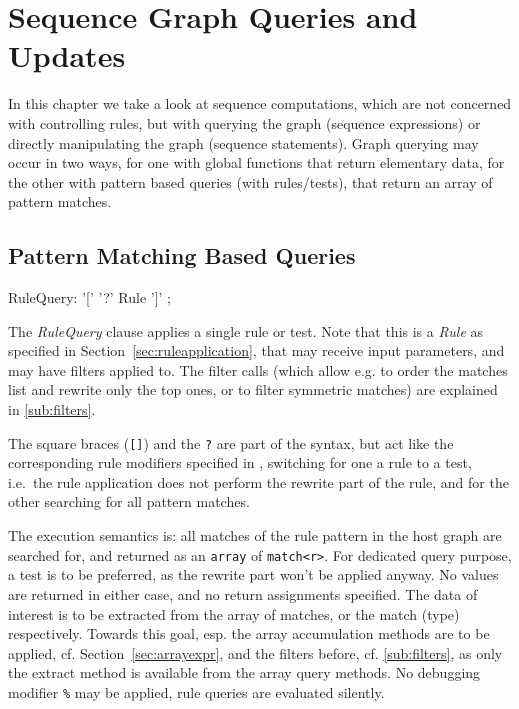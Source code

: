 \chapter{Sequence Graph Queries and Updates}\label{cha:graphquery}%

In this chapter we take a look at sequence computations, which are not concerned with controlling rules, but with querying the graph (sequence expressions) or directly manipulating the graph (sequence statements).
Graph querying may occur in two ways, for one with global functions that return elementary data, for the other with pattern based queries (with rules/tests), that return an array of pattern matches.

\section{Pattern Matching Based Queries}

\begin{rail}
  RuleQuery: '[' '?' Rule ']' ;
\end{rail}

The \emph{RuleQuery} clause applies a single rule or test.
Note that this is a \emph{Rule} as specified in Section~\ref{sec:ruleapplication}, that may receive input parameters, and may have filters applied to.
The filter calls (which allow e.g. to order the matches list and rewrite only the top ones, or to filter symmetric matches) are explained in \ref{sub:filters}.

The square braces (\texttt{[]}) and the \texttt{?} are part of the syntax, but act like the corresponding rule modifiers specified in \label{sec:ruleapplication}, switching for one a rule to a test, i.e.\ the rule application does not perform the rewrite part of the rule, and for the other searching for all pattern matches.

The execution semantics is: all matches of the rule pattern in the host graph are searched for, and returned as an \texttt{array} of \texttt{match<r>}.
For dedicated query purpose, a test is to be preferred, as the rewrite part won't be applied anyway. 
No values are returned in either case, and no return assignments specified.
The data of interest is to be extracted from the array of matches, or the match (type) respectively.
Towards this goal, esp. the array accumulation methods are to be applied, cf. Section~\ref{sec:arrayexpr}, and the filters before, cf. \ref{sub:filters}, as only the extract method is available from the array query methods.
No debugging modifier \texttt{\%} may be applied, rule queries are evaluated silently.

